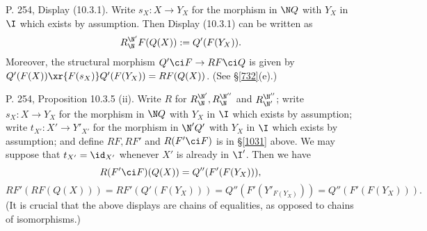 \documentclass[12pt]{article}
\theoremstyle{remark}
\theoremstyle{definition}
\begin{document}
%

\begin{s} 
P. 254, Display (10.3.1). Write $s_X:X\to Y_X$ for the morphism in $\N Q$ with $Y_X$ in $\I$ which exists by assumption. Then Display (10.3.1) can be written as 
$$
R_\N^{\N'}F(Q(X)):=Q'(F(Y_X)).
$$ 
Moreover, the structural morphism $Q'\ci F\to RF\ci Q$ is given by $Q'(F(X))\xr{F(s_X)}Q'(F(Y_X))=RF(Q(X))$. (See \S\ref{732}(e).) 
\end{s}

%

\begin{s}
P. 254, Proposition 10.3.5 (ii). Write $R$ for $R_\N^{\N'},R_\N^{\N''}$ and $R_{\N'}^{\N''}$; write $s_X:X\to Y_X$ for the morphism in $\N Q$ with $Y_X$ in $\I$ which exists by assumption; write $t_{X'}:X'\to Y'_{X'}$ for the morphism in $\N'Q'$ with $Y_X$ in $\I$ which exists by assumption; and define $RF,RF'$ and $R(F'\ci F)$ is in \S\ref{1031} above. We may suppose that $t_{X'}=\id_{X'}$ whenever $X'$ is already in $\I'$. Then we have 
$$
R(F'\ci F)(Q(X))=Q''(F'(F(Y_X))),
$$ 
$$
RF'(RF(Q(X)))=RF'(Q'(F(Y_X)))=Q''(F'(Y'_{F(Y_X)}))=Q''(F'(F(Y_X))).
$$ 
(It is crucial that the above displays are chains of equalities, as opposed to chains of isomorphisms.)
\end{s}

%
\end{document}
